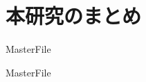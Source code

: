 \section{本研究のまとめ}
\label{con:conclusion}

 \expandafter\ifx\csname MasterFile\endcsname\relax
	\def\BibFile{hoge}
	
  \fi
  \expandafter\ifx\csname MasterFile\endcsname\relax

\fi
